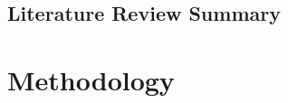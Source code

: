 \documentclass[numbered,pdftex]{ohio-etd}
\begin{document}
\section{Literature Review Summary}


\chapter{Methodology}
\end{document}
